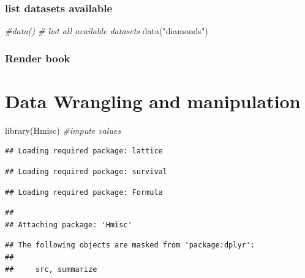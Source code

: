 \documentclass[
]{article}
\newenvironment{Shaded}{\begin{snugshade}}{\end{snugshade}}
\newcommand{\CommentTok}[1]{\textcolor[rgb]{0.56,0.35,0.01}{\textit{#1}}}
\newcommand{\FunctionTok}[1]{\textcolor[rgb]{0.00,0.00,0.00}{#1}}
\newcommand{\NormalTok}[1]{#1}
\newcommand{\StringTok}[1]{\textcolor[rgb]{0.31,0.60,0.02}{#1}}
\begin{document}
\hypertarget{list-datasets-available}{%
\subsubsection{list datasets available}\label{list-datasets-available}}

\begin{Shaded}
\begin{Highlighting}[]
\CommentTok{\#data() \# list all available datasets}
\FunctionTok{data}\NormalTok{(}\StringTok{"diamonds"}\NormalTok{)}
\end{Highlighting}
\end{Shaded}

\hypertarget{render-book}{%
\subsubsection{Render book}\label{render-book}}

\hypertarget{data-wrangling-and-manipulation}{%
\section{Data Wrangling and manipulation}\label{data-wrangling-and-manipulation}}

\begin{Shaded}
\begin{Highlighting}[]
\FunctionTok{library}\NormalTok{(Hmisc) }\CommentTok{\#impute values}
\end{Highlighting}
\end{Shaded}

\begin{verbatim}
## Loading required package: lattice
\end{verbatim}

\begin{verbatim}
## Loading required package: survival
\end{verbatim}

\begin{verbatim}
## Loading required package: Formula
\end{verbatim}

\begin{verbatim}
## 
## Attaching package: 'Hmisc'
\end{verbatim}

\begin{verbatim}
## The following objects are masked from 'package:dplyr':
## 
##     src, summarize
\end{verbatim}
\end{document}
